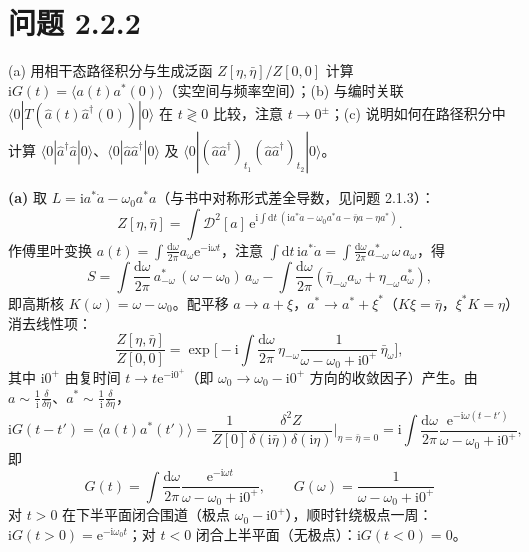 \section*{问题 2.2.2}
\begin{problem}
(a) 用相干态路径积分与生成泛函 $Z[\eta,\bar\eta]/Z[0,0]$ 计算 $\mathrm{i}G(t)=\langle a(t)a^*(0)\rangle$（实空间与频率空间）；(b) 与编时关联 $\langle0|T(\hat a(t)\hat a^\dagger(0))|0\rangle$ 在 $t\gtrless0$ 比较，注意 $t\to0^\pm$；(c) 说明如何在路径积分中计算 $\langle0|\hat a^\dagger\hat a|0\rangle$、$\langle0|\hat a\hat a^\dagger|0\rangle$ 及 $\langle0|(\hat a\hat a^\dagger)_{t_1}(\hat a\hat a^\dagger)_{t_2}|0\rangle$。
\end{problem}
\solution
\textbf{(a)} 取 $L=\mathrm{i}a^*\dot a-\omega_0a^*a$（与书中对称形式差全导数，见问题 2.1.3）：
\begin{equation*}
Z[\eta,\bar\eta]=\int\mathcal D^2[a]\,
\mathrm{e}^{\mathrm{i}\int\mathrm{d}t\,(\mathrm{i}a^*\dot a-\omega_0a^*a-\bar\eta a-\eta a^*)}.
\end{equation*}
作傅里叶变换 $a(t)=\int\frac{\mathrm{d}\omega}{2\pi}a_\omega\mathrm{e}^{-\mathrm{i}\omega t}$，注意 $\int\mathrm{d}t\,\mathrm{i}a^*\dot a=\int\frac{\mathrm{d}\omega}{2\pi}a^*_{-\omega}\,\omega\,a_\omega$，得
\begin{equation*}
S=\int\frac{\mathrm{d}\omega}{2\pi}\,a^*_{-\omega}\,(\omega-\omega_0)\,a_\omega
-\int\frac{\mathrm{d}\omega}{2\pi}(\bar\eta_{-\omega}a_\omega+\eta_{-\omega}a_\omega^*),
\end{equation*}
即高斯核 $K(\omega)=\omega-\omega_0$。配平移 $a\to a+\xi$，$a^*\to a^*+\xi^*$（$K\xi=\bar\eta$，$\xi^*K=\eta$）消去线性项：
\begin{equation*}
\frac{Z[\eta,\bar\eta]}{Z[0,0]}=\exp\Big[-\mathrm{i}\int\frac{\mathrm{d}\omega}{2\pi}\,
\eta_{-\omega}\frac{1}{\omega-\omega_0+\mathrm{i}0^+}\,\bar\eta_\omega\Big],
\end{equation*}
其中 $\mathrm{i}0^+$ 由复时间 $t\to t\mathrm{e}^{-\mathrm{i}0^+}$（即 $\omega_0\to\omega_0-\mathrm{i}0^+$ 方向的收敛因子）产生。由 $a\sim\frac{1}{\mathrm{i}}\frac{\delta}{\delta\bar\eta}$、$a^*\sim\frac{1}{\mathrm{i}}\frac{\delta}{\delta\eta}$，
\begin{equation*}
\mathrm{i}G(t-t')=\langle a(t)a^*(t')\rangle
=\frac{1}{Z[0]}\frac{\delta^2 Z}{\delta(\mathrm{i}\bar\eta)\delta(\mathrm{i}\eta)}\bigg|_{\eta=\bar\eta=0}
=\mathrm{i}\int\frac{\mathrm{d}\omega}{2\pi}\frac{\mathrm{e}^{-\mathrm{i}\omega(t-t')}}{\omega-\omega_0+\mathrm{i}0^+},
\end{equation*}
即
\begin{equation*}
\boxed{\;G(t)=\int\frac{\mathrm{d}\omega}{2\pi}\frac{\mathrm{e}^{-\mathrm{i}\omega t}}{\omega-\omega_0+\mathrm{i}0^+},
\qquad
G(\omega)=\frac{1}{\omega-\omega_0+\mathrm{i}0^+}\;}
\end{equation*}
对 $t>0$ 在下半平面闭合围道（极点 $\omega_0-\mathrm{i}0^+$），顺时针绕极点一周：$\mathrm{i}G(t>0)=\mathrm{e}^{-\mathrm{i}\omega_0t}$；对 $t<0$ 闭合上半平面（无极点）：$\mathrm{i}G(t<0)=0$。

